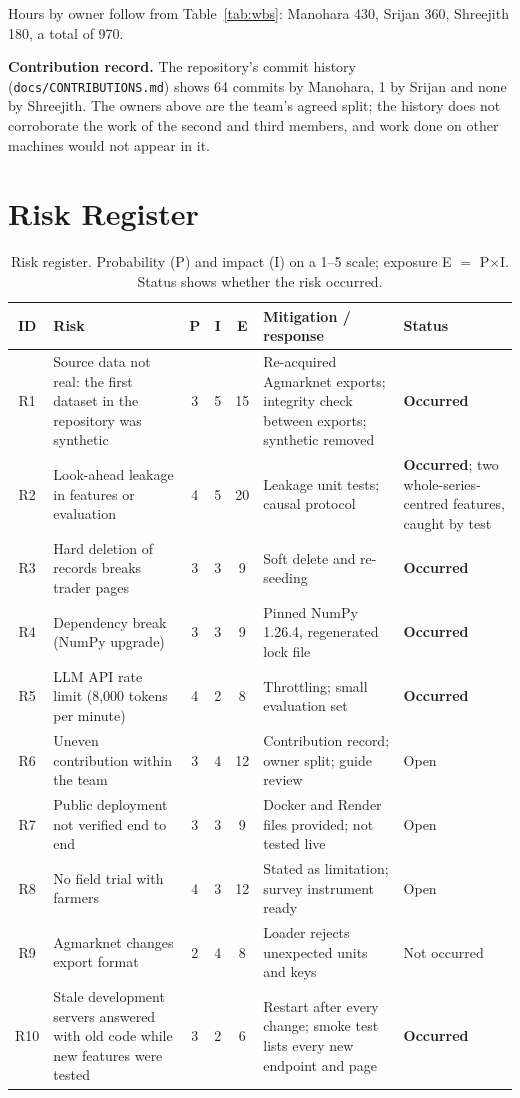 Hours by owner follow from Table~\ref{tab:wbs}: Manohara 430, Srijan 360, Shreejith 180, a total of 970.

\noindent\textbf{Contribution record.} The repository's commit history (\texttt{docs/CONTRIBUTIONS.md}) shows 64 commits by Manohara, 1 by Srijan and none by Shreejith. The owners above are the team's agreed split; the history does not corroborate the work of the second and third members, and work done on other machines would not appear in it.

\section{Risk Register}
\label{sec:risks}

\begin{table}[!t]
\centering
\caption{Risk register. Probability (P) and impact (I) on a 1--5 scale; exposure E $=$ P$\times$I. Status shows whether the risk occurred.}
\label{tab:risks}
\small
\begin{tabular}{|c|p{4.1cm}|c|c|c|p{4.0cm}|p{2.7cm}|}
\hline
\textbf{ID} & \textbf{Risk} & \textbf{P} & \textbf{I} & \textbf{E} & \textbf{Mitigation / response} & \textbf{Status} \\ \hline
R1 & Source data not real: the first dataset in the repository was synthetic & 3 & 5 & 15 & Re-acquired Agmarknet exports; integrity check between exports; synthetic removed & \textbf{Occurred} \\ \hline
R2 & Look-ahead leakage in features or evaluation & 4 & 5 & 20 & Leakage unit tests; causal protocol & \textbf{Occurred}; two whole-series-centred features, caught by test \\ \hline
R3 & Hard deletion of records breaks trader pages & 3 & 3 & 9 & Soft delete and re-seeding & \textbf{Occurred} \\ \hline
R4 & Dependency break (NumPy upgrade) & 3 & 3 & 9 & Pinned NumPy 1.26.4, regenerated lock file & \textbf{Occurred} \\ \hline
R5 & LLM API rate limit (8,000 tokens per minute) & 4 & 2 & 8 & Throttling; small evaluation set & \textbf{Occurred} \\ \hline
R6 & Uneven contribution within the team & 3 & 4 & 12 & Contribution record; owner split; guide review & Open \\ \hline
R7 & Public deployment not verified end to end & 3 & 3 & 9 & Docker and Render files provided; not tested live & Open \\ \hline
R8 & No field trial with farmers & 4 & 3 & 12 & Stated as limitation; survey instrument ready & Open \\ \hline
R9 & Agmarknet changes export format & 2 & 4 & 8 & Loader rejects unexpected units and keys & Not occurred \\ \hline
R10 & Stale development servers answered with old code while new features were tested & 3 & 2 & 6 & Restart after every change; smoke test lists every new endpoint and page & \textbf{Occurred} \\ \hline
\end{tabular}
\end{table}

